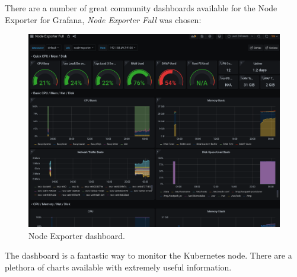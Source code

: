 There are a number of great community dashboards available for the Node Exporter for Grafana, \emph{Node Exporter Full} \autocite{NodeExporterFull} was chosen:
\begin{figure}[H]
	\centering
	\includegraphics[width=1\linewidth]{figures/node_exporter_dashboard.png}
	\caption{Node Exporter dashboard.}
	\label{fig:node_exporter_dashboard}
\end{figure}
The dashboard is a fantastic way to monitor the Kubernetes node. There are a plethora of charts available with extremely useful information.
